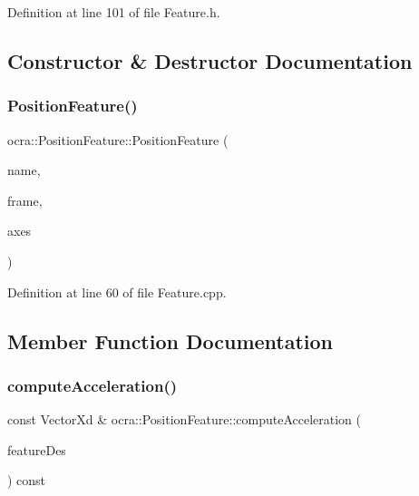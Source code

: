 Definition at line 101 of file Feature.\+h.



\subsection{Constructor \& Destructor Documentation}
\hypertarget{classocra_1_1PositionFeature_abe283f029de484ca1eed44a1f9212f2f}{}\label{classocra_1_1PositionFeature_abe283f029de484ca1eed44a1f9212f2f} 
\subsubsection{\texorpdfstring{Position\+Feature()}{PositionFeature()}}
{\footnotesize\ttfamily ocra\+::\+Position\+Feature\+::\+Position\+Feature (\begin{DoxyParamCaption}\item[{const std\+::string \&}]{name,  }\item[{Control\+Frame\+::\+Ptr}]{frame,  }\item[{\hyperlink{namespaceocra_a436781c7059a0f76027df1c652126260}{E\+Cartesian\+Dof}}]{axes }\end{DoxyParamCaption})}



Definition at line 60 of file Feature.\+cpp.



\subsection{Member Function Documentation}
\hypertarget{classocra_1_1PositionFeature_aeff255bf903c24bd898b3d0e4fd9a14c}{}\label{classocra_1_1PositionFeature_aeff255bf903c24bd898b3d0e4fd9a14c} 
\subsubsection{\texorpdfstring{compute\+Acceleration()}{computeAcceleration()}\hspace{0.1cm}{\footnotesize\ttfamily [1/2]}}
{\footnotesize\ttfamily const Vector\+Xd \& ocra\+::\+Position\+Feature\+::compute\+Acceleration (\begin{DoxyParamCaption}\item[{const \hyperlink{classocra_1_1Feature}{Feature} \&}]{feature\+Des }\end{DoxyParamCaption}) const\hspace{0.3cm}{\ttfamily [virtual]}}



